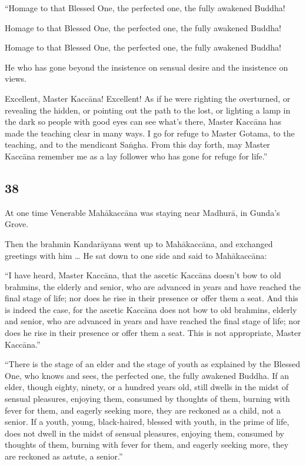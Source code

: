 \documentclass[12pt,openany]{book}%
\begin{document}
“Homage to that Blessed One, the perfected one, the fully awakened Buddha! 

Homage to that Blessed One, the perfected one, the fully awakened Buddha! 

Homage to that Blessed One, the perfected one, the fully awakened Buddha! 

He who has gone beyond the insistence on sensual desire and the insistence on views. 

Excellent, Master \textsanskrit{Kaccāna}! Excellent! As if he were righting the overturned, or revealing the hidden, or pointing out the path to the lost, or lighting a lamp in the dark so people with good eyes can see what’s there, Master \textsanskrit{Kaccāna} has made the teaching clear in many ways. I go for refuge to Master Gotama, to the teaching, and to the mendicant \textsanskrit{Saṅgha}. From this day forth, may Master \textsanskrit{Kaccāna} remember me as a lay follower who has gone for refuge for life.” 

\subsection*{38 }

At one time Venerable \textsanskrit{Mahākaccāna} was staying near \textsanskrit{Madhurā}, in Gunda’s Grove. 

Then the brahmin \textsanskrit{Kandarāyana} went up to \textsanskrit{Mahākaccāna}, and exchanged greetings with him … He sat down to one side and said to \textsanskrit{Mahākaccāna}: 

“I have heard, Master \textsanskrit{Kaccāna}, that the ascetic \textsanskrit{Kaccāna} doesn’t bow to old brahmins, the elderly and senior, who are advanced in years and have reached the final stage of life; nor does he rise in their presence or offer them a seat. And this is indeed the case, for the ascetic \textsanskrit{Kaccāna} does not bow to old brahmins, elderly and senior, who are advanced in years and have reached the final stage of life; nor does he rise in their presence or offer them a seat. This is not appropriate, Master \textsanskrit{Kaccāna}.” 

“There is the stage of an elder and the stage of youth as explained by the Blessed One, who knows and sees, the perfected one, the fully awakened Buddha. If an elder, though eighty, ninety, or a hundred years old, still dwells in the midst of sensual pleasures, enjoying them, consumed by thoughts of them, burning with fever for them, and eagerly seeking more, they are reckoned as a child, not a senior. If a youth, young, black-haired, blessed with youth, in the prime of life, does not dwell in the midst of sensual pleasures, enjoying them, consumed by thoughts of them, burning with fever for them, and eagerly seeking more, they are reckoned as astute, a senior.” 
\end{document}
